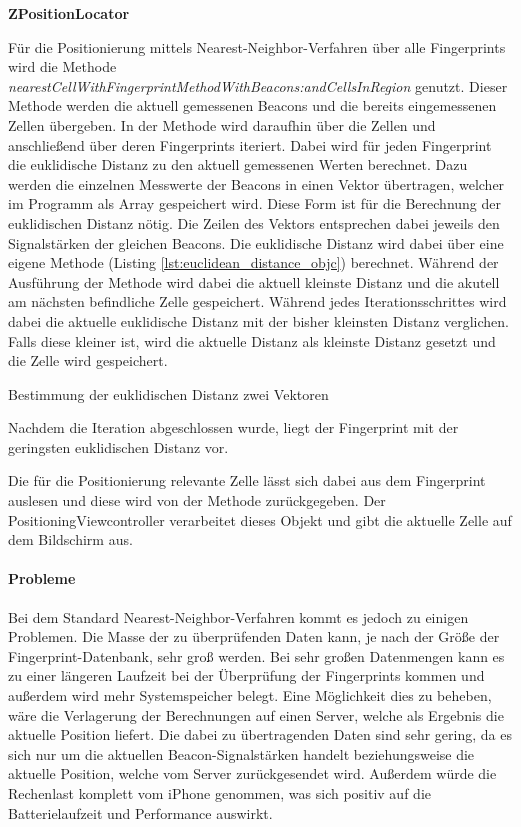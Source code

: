 \textbf{ZPositionLocator}

Für die Positionierung mittels Nearest-Neighbor-Verfahren über alle Fingerprints wird die Methode \emph{nearestCellWithFingerprintMethodWithBeacons:andCellsInRegion} genutzt.
Dieser Methode werden die aktuell gemessenen Beacons und die bereits eingemessenen Zellen übergeben. 
In der Methode wird daraufhin über die Zellen und anschließend über deren Fingerprints iteriert. Dabei wird für jeden Fingerprint die euklidische Distanz zu den aktuell gemessenen Werten berechnet. Dazu werden die einzelnen Messwerte der Beacons in einen Vektor übertragen, welcher im Programm als Array gespeichert wird. Diese Form ist für die Berechnung der euklidischen Distanz nötig. 
Die Zeilen des Vektors entsprechen dabei jeweils den Signalstärken der gleichen Beacons. 
Die euklidische Distanz wird dabei über eine eigene Methode (Listing \ref{lst:euclidean_distance_objc}) berechnet.
Während der Ausführung der Methode wird dabei die aktuell kleinste Distanz und die akutell am nächsten befindliche Zelle gespeichert.
Während jedes Iterationsschrittes wird dabei die aktuelle euklidische Distanz mit der bisher kleinsten Distanz verglichen. Falls diese kleiner ist, wird die aktuelle Distanz als kleinste Distanz gesetzt und die Zelle wird gespeichert.


\begin{listing}[htb!]
    \caption{Bestimmung der euklidischen Distanz zwei Vektoren}
	\label{lst:euclidean_distance_objc}
\end{listing}


Nachdem die Iteration abgeschlossen wurde, liegt der Fingerprint mit der geringsten euklidischen Distanz vor. 

Die für die Positionierung relevante Zelle lässt sich dabei aus dem Fingerprint auslesen und diese wird von der Methode zurückgegeben.
Der PositioningViewcontroller verarbeitet dieses Objekt und gibt die aktuelle Zelle auf dem Bildschirm aus.

\paragraph{Probleme}
\label{sec:implementation:fingerprinting:positioning:naiv:problems}
Bei dem Standard Nearest-Neighbor-Verfahren kommt es jedoch zu einigen Problemen. 
Die Masse der zu überprüfenden Daten kann, je nach der Größe der Fingerprint-Datenbank, sehr groß werden. Bei sehr großen Datenmengen kann es zu einer längeren Laufzeit bei der Überprüfung der Fingerprints kommen und außerdem wird mehr Systemspeicher belegt. 
Eine Möglichkeit dies zu beheben, wäre die Verlagerung der Berechnungen auf einen Server, welche als Ergebnis die aktuelle Position liefert. Die dabei zu übertragenden Daten sind sehr gering, da es sich nur um die aktuellen Beacon-Signalstärken handelt beziehungsweise die aktuelle Position, welche vom Server zurückgesendet wird. 
Außerdem würde die Rechenlast komplett vom iPhone genommen, was sich positiv auf die Batterielaufzeit und Performance auswirkt.

